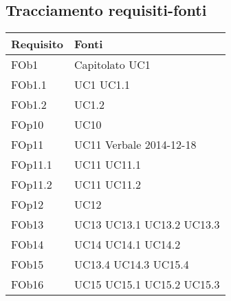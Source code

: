 \subsection{ Tracciamento requisiti-fonti}
	
\begin{longtable}{|l|p{4cm}|}
\hline
\textbf{Requisito} & \textbf{Fonti} \\
\hline
FOb1 & Capitolato \linebreak UC1 \linebreak \\ 
\hline
FOb1.1 & UC1 \linebreak  UC1.1 \linebreak  \\ 
\hline
FOb1.2 & UC1.2 \linebreak  \\ 
\hline
FOp10 & UC10 \linebreak \\ 
\hline
FOp11 & UC11 \linebreak Verbale 2014-12-18 \linebreak \\ 
\hline
FOp11.1 & UC11 \linebreak  UC11.1 \linebreak  \\ 
\hline
FOp11.2 & UC11 \linebreak  UC11.2 \linebreak  \\ 
\hline
FOp12 & UC12 \linebreak \\ 
\hline
FOb13 & UC13 \linebreak UC13.1 \linebreak UC13.2 \linebreak UC13.3 \linebreak \\ 
\hline
FOb14 & UC14 \linebreak UC14.1 \linebreak UC14.2 \linebreak \\ 
\hline
FOb15 & UC13.4 \linebreak UC14.3 \linebreak UC15.4 \linebreak \\ 
\hline
FOb16 & UC15 \linebreak UC15.1 \linebreak UC15.2 \linebreak UC15.3 \linebreak \\ 

\end{longtable}
